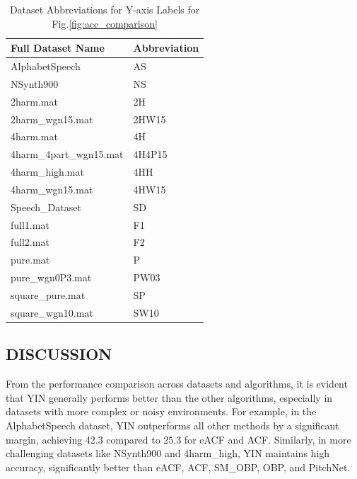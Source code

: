 \documentclass{ieeeaccess}
\begin{document}
\begin{table}[h!]
\centering
\label{tab:dataset_mapping}
\begin{tabular}{|l|l|}
\hline
\textbf{Full Dataset Name}          & \textbf{Abbreviation} \\ \hline
AlphabetSpeech                      & AS                    \\ \hline
NSynth900                           & NS                    \\ \hline
2harm.mat                           & 2H                    \\ \hline
2harm\_wgn15.mat                    & 2HW15                 \\ \hline
4harm.mat                           & 4H                    \\ \hline
4harm\_4part\_wgn15.mat             & 4H4P15                \\ \hline
4harm\_high.mat                     & 4HH                   \\ \hline
4harm\_wgn15.mat                    & 4HW15                 \\ \hline
Speech\_Dataset                     & SD                    \\ \hline
full1.mat                           & F1                    \\ \hline
full2.mat                           & F2                    \\ \hline
pure.mat                            & P                     \\ \hline
pure\_wgn0P3.mat                    & PW03                  \\ \hline
square\_pure.mat                    & SP                    \\ \hline
square\_wgn10.mat                   & SW10                  \\ \hline
\end{tabular}
\caption{\centering Dataset Abbreviations for Y-axis Labels for Fig.\ref{fig:acc_comparison}}
\end{table}

\subsection{DISCUSSION}
From the performance comparison across datasets and algorithms, it is evident that YIN generally performs better than the other algorithms, especially in datasets with more complex or noisy environments. For example, in the AlphabetSpeech dataset, YIN outperforms all other methods by a significant margin, achieving 42.3 compared to 25.3 for eACF and ACF. Similarly, in more challenging datasets like NSynth900 and 4harm\_high, YIN maintains high accuracy, significantly better than eACF, ACF, SM\_OBP, OBP, and PitchNet.
\end{document}
